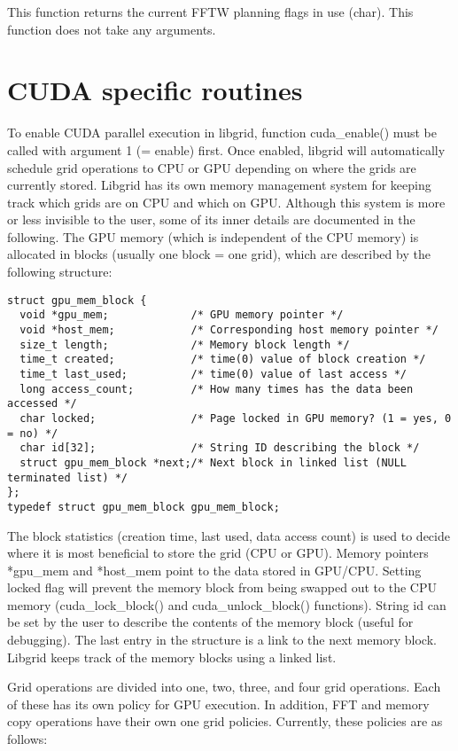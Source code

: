 \documentclass[12pt,letterpaper]{report}
\begin{document}
This function returns the current FFTW planning flags in use (char). This function does not take any arguments.

\section{CUDA specific routines}

To enable CUDA parallel execution in libgrid, function cuda\_enable() must be called with argument 1 (= enable) first. Once enabled, libgrid will automatically schedule grid operations to CPU or GPU depending on where the grids are currently stored. Libgrid has its own memory management system for keeping track which grids are on CPU and which on GPU. Although this system is more or less invisible to the user, some of its inner details are documented in the following. The GPU memory (which is independent of the CPU memory) is allocated in blocks (usually one block = one grid), which are described by the following structure:
\begin{verbatim}
struct gpu_mem_block {
  void *gpu_mem;             /* GPU memory pointer */
  void *host_mem;            /* Corresponding host memory pointer */
  size_t length;             /* Memory block length */
  time_t created;            /* time(0) value of block creation */
  time_t last_used;          /* time(0) value of last access */
  long access_count;         /* How many times has the data been accessed */
  char locked;               /* Page locked in GPU memory? (1 = yes, 0 = no) */
  char id[32];               /* String ID describing the block */
  struct gpu_mem_block *next;/* Next block in linked list (NULL terminated list) */
}; 
typedef struct gpu_mem_block gpu_mem_block;
\end{verbatim}
The block statistics (creation time, last used, data access count) is used to decide where it is most beneficial to store the grid (CPU or GPU). Memory pointers *gpu\_mem and *host\_mem point to the data stored in GPU/CPU. Setting locked flag will prevent the memory block from being swapped out to the CPU memory (cuda\_lock\_block() and cuda\_unlock\_block() functions). String id can be set by the user to describe the contents of the memory block (useful for debugging). The last entry in the structure is a link to the next memory block. Libgrid keeps track of the memory blocks using a linked list.

Grid operations are divided into one, two, three, and four grid operations. Each of these has its own policy for GPU execution. In addition, FFT and memory copy operations have their own one grid policies. Currently, these policies are as follows:\\
\end{document}
